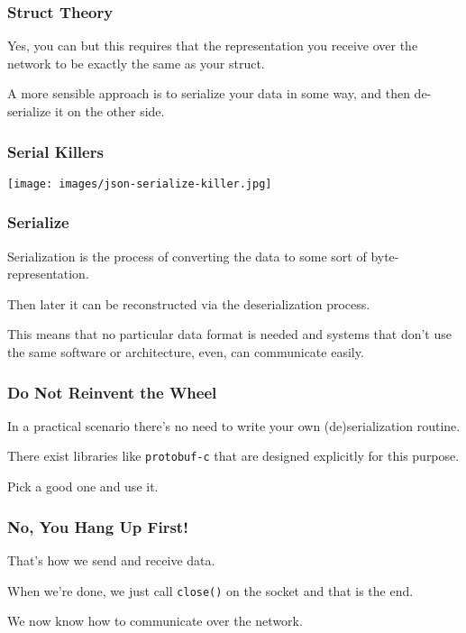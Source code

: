 \begin{frame}
	\frametitle{Struct Theory}

	Yes, you can but this requires that the representation you receive over the network to be exactly the same as your struct.

	A more sensible approach is to serialize your data in some way, and then de-serialize it on the other side.

\end{frame}



\begin{frame}
	\frametitle{Serial Killers}

	\begin{center}
		\texttt{[image: images/json-serialize-killer.jpg]}
	\end{center}


\end{frame}



\begin{frame}
	\frametitle{Serialize}

	Serialization is the process of converting the data to some sort of byte-representation.

	Then later it can be reconstructed via the deserialization process.

	This means that no particular data format is needed and systems that don't use the same software or architecture, even, can communicate easily.

\end{frame}



\begin{frame}
	\frametitle{Do Not Reinvent the Wheel}

	In a practical scenario there's no need to write your own (de)serialization routine.

	There exist libraries like \texttt{protobuf-c} that are designed explicitly for this purpose.

	Pick a good one and use it.

\end{frame}



\begin{frame}
	\frametitle{No, You Hang Up First!}

	That's how we send and receive data.

	When we're done, we just call \texttt{close()} on the socket and that is the end.

	We now know how to communicate over the network.


\end{frame}



